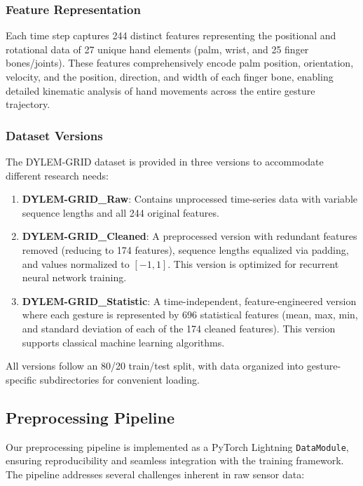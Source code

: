 \documentclass[conference]{IEEEtran}
\begin{document}
\subsubsection{Feature Representation}
Each time step captures 244 distinct features representing the positional and rotational data of 27 unique hand elements (palm, wrist, and 25 finger bones/joints). These features comprehensively encode palm position, orientation, velocity, and the position, direction, and width of each finger bone, enabling detailed kinematic analysis of hand movements across the entire gesture trajectory.

\subsubsection{Dataset Versions}
The DYLEM-GRID dataset is provided in three versions to accommodate different research needs:

\begin{enumerate}
    \item \textbf{DYLEM-GRID\_Raw}: Contains unprocessed time-series data with variable sequence lengths and all 244 original features.
    
    \item \textbf{DYLEM-GRID\_Cleaned}: A preprocessed version with redundant features removed (reducing to 174 features), sequence lengths equalized via padding, and values normalized to $[-1, 1]$. This version is optimized for recurrent neural network training.
    
    \item \textbf{DYLEM-GRID\_Statistic}: A time-independent, feature-engineered version where each gesture is represented by 696 statistical features (mean, max, min, and standard deviation of each of the 174 cleaned features). This version supports classical machine learning algorithms.
\end{enumerate}

All versions follow an 80/20 train/test split, with data organized into gesture-specific subdirectories for convenient loading.

\subsection{Preprocessing Pipeline}
Our preprocessing pipeline is implemented as a PyTorch Lightning \texttt{DataModule}, ensuring reproducibility and seamless integration with the training framework. The pipeline addresses several challenges inherent in raw sensor data:
\end{document}
